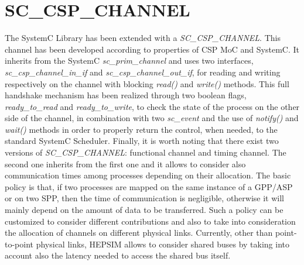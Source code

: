 \section{SC\_CSP\_CHANNEL}
%
The SystemC Library has been extended with a \textit{SC\_CSP\_CHANNEL}. This channel has been developed according to properties of CSP MoC and SystemC. It inherits from the SystemC \textit{sc\_prim\_channel} and uses two interfaces, \textit{sc\_csp\_channel\_in\_if} and \textit{sc\_csp\_channel\_out\_if}, for reading and writing respectively on the channel with blocking \textit{read()} and \textit{write()} methods. This full handshake mechanism has been realized through two boolean flags, \textit{ready\_to\_read} and \textit{ready\_to\_write}, to check the state of the process on the other side of the channel, in combination with two \textit{sc\_event} and the use of \textit{notify()} and \textit{wait()} methods in order to properly return the control, when needed, to the standard SystemC Scheduler. Finally, it is worth noting that there exist two versions of \textit{SC\_CSP\_CHANNEL}: functional channel and timing channel. The second one inherits from the first one and it allows to consider also communication times among processes depending on their allocation. The basic policy is that, if two processes are mapped on the same instance of a GPP/ASP or on two SPP, then the time of communication is negligible, otherwise it will mainly depend on the amount of data to be transferred. Such a policy can be customized to consider different contributions and also to take into consideration the allocation of channels on different physical links. Currently, other than point-to-point physical links, HEPSIM allows to consider shared buses by taking into account also the latency needed to access the shared bus itself. \par
%
